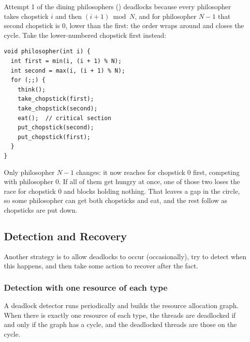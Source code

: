 \begin{example}
  Attempt 1 of the dining philosophers () deadlocks because every philosopher takes chopstick $i$ and then $(i + 1) \bmod N$, and for philosopher $N - 1$ that second chopstick is $0$, lower than the first: the order wraps around and closes the cycle. Take the lower-numbered chopstick first instead:
\begin{lstlisting}
void philosopher(int i) {
  int first = min(i, (i + 1) % N);
  int second = max(i, (i + 1) % N);
  for (;;) {
    think();
    take_chopstick(first);
    take_chopstick(second);
    eat();  // critical section
    put_chopstick(second);
    put_chopstick(first);
  }
}
\end{lstlisting}
  Only philosopher $N - 1$ changes: it now reaches for chopstick $0$ first, competing with philosopher $0$. If all of them get hungry at once, one of those two loses the race for chopstick $0$ and blocks holding nothing. That leaves a gap in the circle, so some philosopher can get both chopsticks and eat, and the rest follow as chopsticks are put down.
\end{example}

\subsection{Detection and Recovery}

Another strategy is to allow deadlocks to occur (occasionally), try to detect when this happens, and then take some action to recover after the fact.

\subsubsection{Detection with one resource of each type}
A deadlock detector runs periodically and builds the resource allocation graph. When there is exactly one resource of each type, the threads are deadlocked if and only if the graph has a cycle, and the deadlocked threads are those on the cycle.

